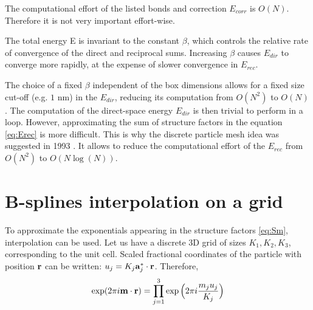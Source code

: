 \documentclass[12pt,a4paper]{report}
\newcommand{\draft}[1]{#1}
\begin{document}

The computational effort of the listed bonds and correction $E_{corr}$ is $O(N)$. Therefore it is not very important effort-wise.

The total energy E is invariant to the constant $\beta$, which
controls the relative rate of convergence of the direct and
reciprocal sums. Increasing $\beta$ causes $E_{dir}$ to converge more
rapidly, at the expense of slower convergence in $E_{rec}$.

The choice of a fixed $\beta$ independent of the box
dimensions allows for a fixed size cut-off (e.g. $1$ nm) in the
$E_{dir}$, reducing its computation from $O(N^2)$ to $O(N)$.
The computation of the direct-space energy $E_{dir}$ is then trivial to perform in a loop. However, approximating the sum of structure factors in the equation \eqref{eq:Erec} is more difficult. This is why the discrete particle mesh idea was suggested in 1993 \cite{pme}. It allows to reduce the computational effort of the $E_{rec}$ from $O(N^2)$ to  $O(N \log (N))$.


\section{B-splines interpolation on a grid}
To approximate the exponentials appearing in the structure factors \eqref{eq:Sm}, interpolation can be used. Let us have a discrete 3D grid of sizes $K_1, K_2, K_3$, corresponding to the  unit cell. Scaled fractional coordinates of the particle with position $\bold{r}$ can be written: $u_j = K_j \bold{a}_j^*\cdot  \bold{r}$. 
Therefore, 
\[\exp(2\pi i\bold{m}\cdot\bold{r}) = \prod\limits_{j=1}^3\exp\Big(2\pi i\frac{m_j u_j}{K_j}\Big)\]


\end{document}
